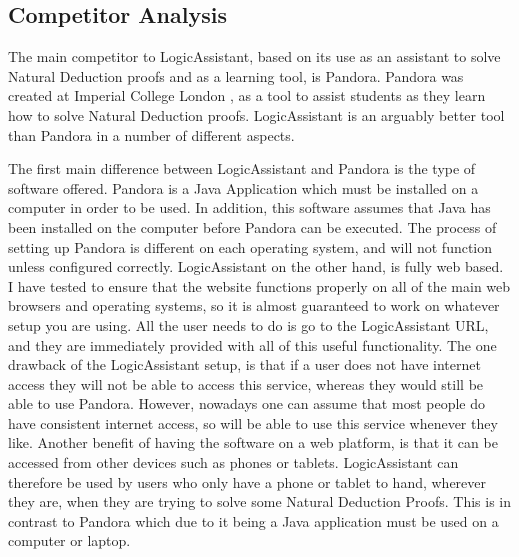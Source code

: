 \subsection{Competitor Analysis}

The main competitor to LogicAssistant, based on its use as an assistant to solve Natural Deduction proofs and as a learning tool, is Pandora. Pandora was created at Imperial College London \cite{pandora}, as a tool to assist students as they learn how to solve Natural Deduction proofs. LogicAssistant is an arguably better tool than Pandora in a number of different aspects.

The first main difference between LogicAssistant and Pandora is the type of software offered. Pandora is a Java Application which must be installed on a computer in order to be used. In addition, this software assumes that Java has been installed on the computer before Pandora can be executed. The process of setting up Pandora is different on each operating system, and will not function unless configured correctly. LogicAssistant on the other hand, is fully web based. I have tested to ensure that the website functions properly on all of the main web browsers and operating systems, so it is almost guaranteed to work on whatever setup you are using. All the user needs to do is go to the LogicAssistant URL, and they are immediately provided with all of this useful functionality. The one drawback of the LogicAssistant setup, is that if a user does not have internet access they will not be able to access this service, whereas they would still be able to use Pandora. However, nowadays one can assume that most people do have consistent internet access, so will be able to use this service whenever they like. Another benefit of having the software on a web platform, is that it can be accessed from other devices such as phones or tablets. LogicAssistant can therefore be used by users who only have a phone or tablet to hand, wherever they are, when they are trying to solve some Natural Deduction Proofs. This is in contrast to Pandora which due to it being a Java application must be used on a computer or laptop.

